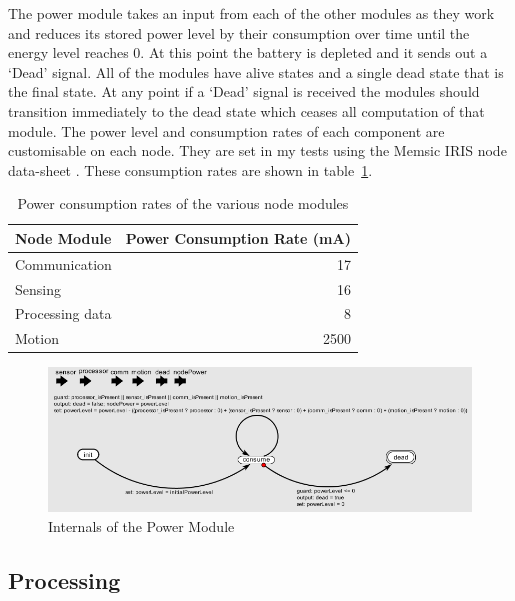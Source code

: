 \documentclass[authoryearcitations]{UoYCSproject}
\begin{document}
The power module takes an input from each of the other modules as they work and reduces its stored power level by their consumption over time until the energy level reaches 0. At this point the battery is depleted and it sends out a `Dead' signal. All of the modules have alive states and a single dead state that is the final state. At any point if a `Dead' signal is received the modules should transition immediately to the dead state which ceases all computation of that module. The power level and consumption rates of each component are customisable on each node. They are set in my tests using the Memsic IRIS node data-sheet \citep{Memsic2011}. These consumption rates are shown in table~\ref{tab:powerRates}.

\begin{table}[]
\centering
\begin{tabular}{@{}lr@{}}
\toprule
Node Module     & Power Consumption Rate (mA) \\ \midrule
Communication   & 17                          \\
Sensing         & 16                          \\
Processing data & 8                           \\
Motion          & 2500                        \\ \bottomrule
\end{tabular}
\caption{Power consumption rates of the various node modules}
\label{tab:powerRates}
\end{table}

\begin{figure}
 \centering
    \includegraphics[width=\textwidth]{figures/powerInternals.png}
    \caption{Internals of the Power Module}
    \label{fig:powerInternals}
\end{figure}

\subsection{Processing}
\end{document}
